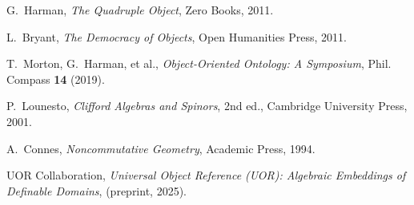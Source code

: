 \documentclass[11pt]{article}
\begin{document}

\begin{thebibliography}{99}

G.~Harman, 
\emph{The Quadruple Object}, 
Zero Books, 2011.

L.~Bryant, 
\emph{The Democracy of Objects}, 
Open Humanities Press, 2011.

T.~Morton, G.~Harman, et al., 
\emph{Object-Oriented Ontology: A Symposium}, 
Phil. Compass \textbf{14} (2019).

P.~Lounesto,
\emph{Clifford Algebras and Spinors},
2nd ed., Cambridge University Press, 2001.

A.~Connes,
\emph{Noncommutative Geometry},
Academic Press, 1994.

UOR Collaboration,
\emph{Universal Object Reference (UOR): Algebraic Embeddings of Definable Domains},
(preprint, 2025).

\end{thebibliography}
\end{document}
